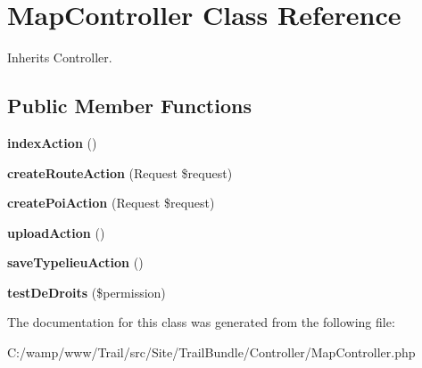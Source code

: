 \hypertarget{class_site_1_1_trail_bundle_1_1_controller_1_1_map_controller}{}\section{Map\+Controller Class Reference}
\label{class_site_1_1_trail_bundle_1_1_controller_1_1_map_controller}


Inherits Controller.

\subsection*{Public Member Functions}
\begin{DoxyCompactItemize}
\item 
\hypertarget{class_site_1_1_trail_bundle_1_1_controller_1_1_map_controller_a04f2101fe1cdc785b61219c2df753024}{}{\bfseries index\+Action} ()\label{class_site_1_1_trail_bundle_1_1_controller_1_1_map_controller_a04f2101fe1cdc785b61219c2df753024}

\item 
\hypertarget{class_site_1_1_trail_bundle_1_1_controller_1_1_map_controller_a9571701622e49f6a829db3c9aaba68ef}{}{\bfseries create\+Route\+Action} (Request \$request)\label{class_site_1_1_trail_bundle_1_1_controller_1_1_map_controller_a9571701622e49f6a829db3c9aaba68ef}

\item 
\hypertarget{class_site_1_1_trail_bundle_1_1_controller_1_1_map_controller_a1c3a96c777e02ac6d1a207434ee9ba4a}{}{\bfseries create\+Poi\+Action} (Request \$request)\label{class_site_1_1_trail_bundle_1_1_controller_1_1_map_controller_a1c3a96c777e02ac6d1a207434ee9ba4a}

\item 
\hypertarget{class_site_1_1_trail_bundle_1_1_controller_1_1_map_controller_a58b4363c152ece55b936920010832a25}{}{\bfseries upload\+Action} ()\label{class_site_1_1_trail_bundle_1_1_controller_1_1_map_controller_a58b4363c152ece55b936920010832a25}

\item 
\hypertarget{class_site_1_1_trail_bundle_1_1_controller_1_1_map_controller_a541d6d5d72297b5f65d4ce71382acc19}{}{\bfseries save\+Typelieu\+Action} ()\label{class_site_1_1_trail_bundle_1_1_controller_1_1_map_controller_a541d6d5d72297b5f65d4ce71382acc19}

\item 
\hypertarget{class_site_1_1_trail_bundle_1_1_controller_1_1_map_controller_a49387e8719305355ba3fae06b0b9bc2a}{}{\bfseries test\+De\+Droits} (\$permission)\label{class_site_1_1_trail_bundle_1_1_controller_1_1_map_controller_a49387e8719305355ba3fae06b0b9bc2a}

\end{DoxyCompactItemize}


The documentation for this class was generated from the following file\+:\begin{DoxyCompactItemize}
\item 
C\+:/wamp/www/\+Trail/src/\+Site/\+Trail\+Bundle/\+Controller/Map\+Controller.\+php\end{DoxyCompactItemize}
